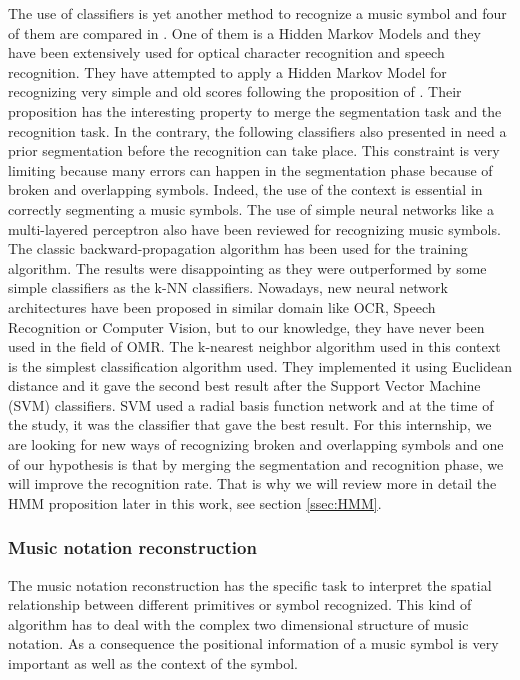 \documentclass[11pt]{sdm}
\begin{document}
The use of classifiers is yet another method to recognize a music symbol and four of them are compared in \cite{rebelo_optical_2009}.
One of them is a Hidden Markov Models and they have been extensively used for optical character recognition and speech recognition.
They have attempted to apply a Hidden Markov Model for recognizing very simple and old scores following the proposition of \cite{pugin_optical_2006}.
Their proposition has the interesting property to merge the segmentation task and the recognition task.
In the contrary, the following classifiers also presented in \cite{rebelo_optical_2009} need a prior segmentation before the recognition can take place.
This constraint is very limiting because many errors can happen in the segmentation phase because of broken and overlapping symbols.
Indeed, the use of the context is essential in correctly segmenting a music symbols.
The use of simple neural networks like a multi-layered perceptron also have been reviewed for recognizing music symbols.
The classic backward-propagation algorithm has been used for the training algorithm.
The results were disappointing as they were outperformed by some simple classifiers as the k-NN classifiers.
Nowadays, new neural network architectures have been proposed in similar domain like OCR, Speech Recognition or Computer Vision, but to our knowledge, they have never been used in the field of OMR.
The k-nearest neighbor algorithm used in this context is the simplest classification algorithm used.
They implemented it using Euclidean distance and it gave the second best result after the Support Vector Machine (SVM) classifiers.
SVM used a radial basis function network and at the time of the study, it was the classifier that gave the best result.
For this internship, we are looking for new ways of recognizing broken and overlapping symbols and one of our hypothesis is that by merging the segmentation and recognition phase, we will improve the recognition rate.
That is why we will review more in detail the HMM proposition later in this work, see section \ref{ssec:HMM}.

\subsubsection{Music notation reconstruction}

The music notation reconstruction has the specific task to interpret the spatial relationship between different primitives or symbol recognized.
This kind of algorithm has to deal with the complex two dimensional structure of music notation.
As a consequence the positional information of a music symbol is very important as well as the context of the symbol.
\end{document}
